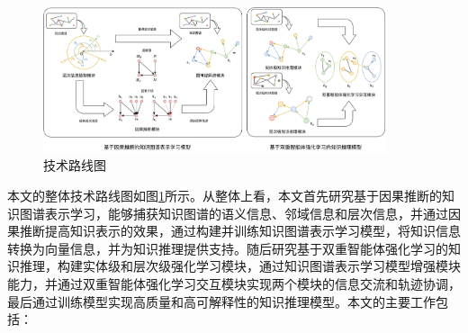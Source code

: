 \documentclass[algorithmlist, AutoFakeBold, AutoFakeSlant, figurelist, tablelist, nomlist, engineering]{seuthesix}
\begin{document}
\begin{figure}
  \centering
  \includegraphics[width=0.9\textwidth]{1_Total}
  \caption{技术路线图}
  \label{1_Total}
\end{figure}
本文的整体技术路线图如图\ref{1_Total}所示。从整体上看，本文首先研究基于因果推断的知识图谱表示学习，能够捕获知识图谱的语义信息、邻域信息和层次信息，并通过因果推断提高知识表示的效果，通过构建并训练知识图谱表示学习模型，将知识信息转换为向量信息，并为知识推理提供支持。随后研究基于双重智能体强化学习的知识推理，构建实体级和层次级强化学习模块，通过知识图谱表示学习模型增强模块能力，并通过双重智能体强化学习交互模块实现两个模块的信息交流和轨迹协调，最后通过训练模型实现高质量和高可解释性的知识推理模型。本文的主要工作包括：
\end{document}
